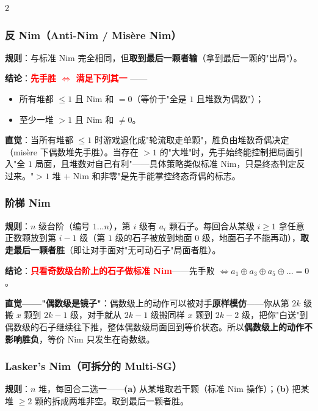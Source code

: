 \begin{multicols*}{2}
		\subsubsection{反 Nim（Anti-Nim / Misère Nim）}

		\textbf{规则}：与标准 Nim 完全相同，但\textbf{取到最后一颗者输}（拿到最后一颗的"出局"）。

		\textbf{结论}：\textcolor{red}{\textbf{先手胜 $\iff$ 满足下列其一}} ——
		\begin{itemize}
			\item 所有堆都 $\le 1$ 且 Nim 和 $=0$（等价于"全是 $1$ 且堆数为偶数"）；
			\item 至少一堆 $> 1$ 且 Nim 和 $\neq 0$。
		\end{itemize}

		\textbf{直觉}：当所有堆都 $\le 1$ 时游戏退化成"轮流取走单颗"，胜负由堆数奇偶决定（misère 下偶数堆先手胜）。当存在 $>1$ 的"大堆"时，先手始终能控制把局面引入"全 $1$ 局面，且堆数对自己有利"——具体策略类似标准 Nim，只是终态判定反过来。"$>1$ 堆 + Nim 和非零"是先手能掌控终态奇偶的标志。

		\subsubsection{阶梯 Nim}

		\textbf{规则}：$n$ 级台阶（编号 $1 \dots n$），第 $i$ 级有 $a_i$ 颗石子。每回合从某级 $i \ge 1$ 拿任意正数颗放到第 $i-1$ 级（第 $1$ 级的石子被放到地面 $0$ 级，地面石子不能再动），\textbf{取走最后一颗者胜}（即让对手面对"无可动石子"局面者胜）。

		\textbf{结论}：\textcolor{red}{\textbf{只看奇数级台阶上的石子做标准 Nim}}——先手败 $\iff a_1 \oplus a_3 \oplus a_5 \oplus \dots = 0$。

		\textbf{直觉——"偶数级是镜子"}：偶数级上的动作可以被对手\textbf{原样模仿}——你从第 $2k$ 级搬 $x$ 颗到 $2k-1$ 级，对手就从 $2k-1$ 级搬同样 $x$ 颗到 $2k-2$ 级，把你"白送"到偶数级的石子继续往下推，整体偶数级局面回到等价状态。所以\textbf{偶数级上的动作不影响胜负}，等价 Nim 只发生在奇数级。

		\subsubsection{Lasker's Nim（可拆分的 Multi-SG）}

		\textbf{规则}：$n$ 堆，每回合二选一——\textbf{(a)} 从某堆取若干颗（标准 Nim 操作）；\textbf{(b)} 把某堆 $\ge 2$ 颗的拆成两堆非空。取到最后一颗者胜。


\end{multicols*}
